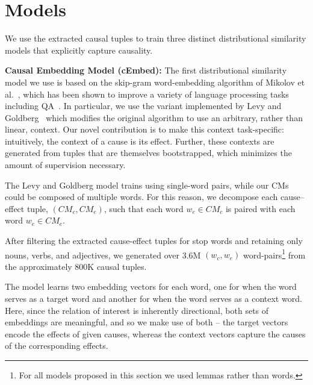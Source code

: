 \section{Models}
\label{sec:models}

We use the extracted causal tuples to train three distinct distributional similarity models that explicitly capture causality. 

{\flushleft \textbf{Causal Embedding Model (cEmbed):}}
The first distributional similarity model we use is based on the skip-gram word-embedding algorithm of Mikolov et al.~, which has been shown to improve a variety of language processing tasks %
including QA~\cite{yih13,fried2015higher}.  In particular, we use the variant implemented by Levy and Goldberg~ which modifies the original algorithm to use an arbitrary, rather than linear, context. 
Our novel contribution is to make this context task-specific: intuitively, the context of a cause is its effect. Further, these contexts are generated from tuples that are themselves bootstrapped, which minimizes the amount of supervision necessary.

The Levy and Goldberg model trains using single-word pairs, while our CMs could be composed of multiple words.  
For this reason, we decompose each cause--effect tuple, $(CM_c,CM_e)$, such that each word $w_c \in CM_c$ is paired with each word $w_e \in CM_e$. 

After filtering the extracted cause-effect tuples for stop words and retaining only nouns, verbs, and adjectives, we generated over 3.6M $(w_c, w_e)$ word-pairs\footnote{For all models proposed in this section we used lemmas rather than words.} from the approximately 800K causal tuples.

The model learns two embedding vectors for each word, one for when the word serves as a target word and another for when the word serves as a context word.  Here, since the relation of interest is inherently directional, both sets of embeddings are meaningful, and so we make use of both -- the target vectors encode the effects of given causes, whereas the context vectors capture the causes of the corresponding effects. 


